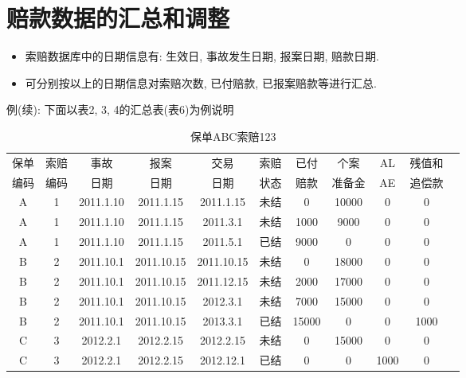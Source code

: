\documentclass[professionalfont]{beamer}
\begin{document}
\section{赔款数据的汇总和调整}
\begin{frame}
	\begin{itemize}
		\item 索赔数据库中的日期信息有: 生效日, 事故发生日期, 报案日期, 赔款日期.
		\item 可分别按以上的日期信息对索赔次数, 已付赔款, 已报案赔款等进行汇总.

	\end{itemize}
\end{frame}
\begin{frame}{}
例(续): 下面以表2, 3, 4的汇总表(表6)为例说明
{\tiny \begin{table}[]
		\centering
		\caption{保单ABC索赔123}
		\label{my-label}
		\begin{tabular}{ccccccccccc}
			\hline
			保单 & 索赔 & 事故        & 报案        & 交易        & 索赔   & 已付   & 个案    & AL& 残值和 \\
			编码 & 编码 & 日期        & 日期        & 日期        & 状态   & 赔款   & 准备金   &AE                       & 追偿款 \\ \hline
			A  & 1  & 2011.1.10 & 2011.1.15 & 2011.1.15 & 未结  & 0    & 10000 & 0                     & 0   \\
			A  & 1  & 2011.1.10 & 2011.1.15 & 2011.3.1  & 未结 & 1000 & 9000  & 0                     & 0   \\
			A  & 1  & 2011.1.10 & 2011.1.15 & 2011.5.1  & 已结 & 9000 & 0     & 0                     & 0   \\ \hline
			B  & 2  & 2011.10.1 & 2011.10.15 & 2011.10.15 & 未结 & 0     & 18000 & 0                     & 0    \\
			B  & 2  & 2011.10.1 & 2011.10.15 & 2011.12.15 & 未结  & 2000  & 17000 & 0                     & 0    \\
			B  & 2  & 2011.10.1 & 2011.10.15 & 2012.3.1   & 未结  & 7000  & 15000 & 0                     & 0    \\
			B  & 2  & 2011.10.1 & 2011.10.15 & 2013.3.1   & 已结 & 15000 & 0     & 0                     & 1000 \\ \hline
			C  & 3  & 2012.2.1 & 2012.2.15 & 2012.2.15 & 未结  & 0  & 15000 & 0                     & 0   \\
			C  & 3  & 2012.2.1 & 2012.2.15 & 2012.12.1 & 已结 & 0  & 0     & 1000                  & 0   \\ \hline
		\end{tabular}
	\end{table}	}
\end{frame}
\end{document}
